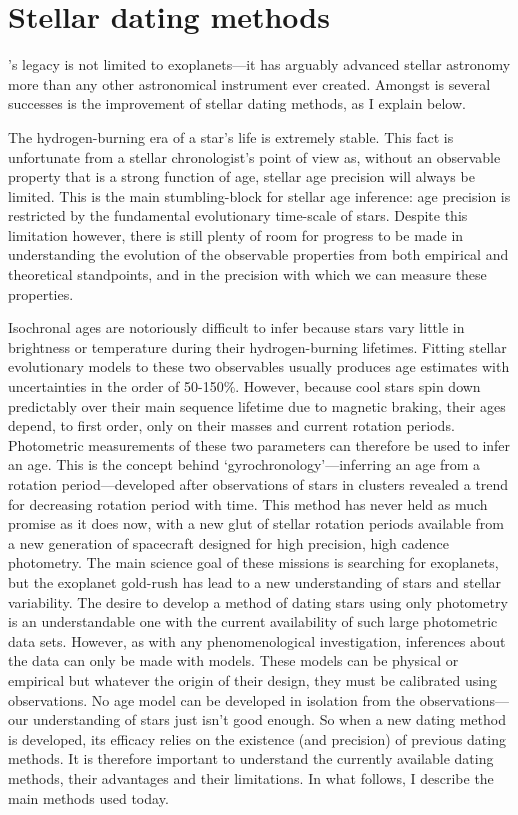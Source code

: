\section{Stellar dating methods}

\kepler's legacy is not limited to exoplanets---it has arguably advanced
stellar astronomy more than any other astronomical instrument ever created.
Amongst is several successes is the improvement of stellar dating methods, as
I explain below.

The hydrogen-burning era of a star's life is extremely stable.
This fact is unfortunate from a stellar chronologist's point of view as,
without an observable property that is a strong function of age, stellar age
precision will always be limited.
This is the main stumbling-block for stellar age inference: age precision is
restricted by the fundamental evolutionary time-scale of stars.
Despite this limitation however, there is still plenty of room for progress to
be made in understanding the evolution of the observable properties from both
empirical and theoretical standpoints, and in the precision with which we can
measure these properties.

Isochronal ages are notoriously difficult to infer because stars vary little
in brightness or temperature during their hydrogen-burning lifetimes.
Fitting stellar evolutionary models to these two observables usually produces
age estimates with uncertainties in the order of 50-150\%.
However, because cool stars spin down predictably over their main sequence
lifetime due to magnetic braking, their ages depend, to first order, only on
their masses and current rotation periods.
Photometric measurements of these two parameters can therefore be used to
infer an age.
This is the concept behind `gyrochronology'---inferring an age from a rotation
period---developed after observations of stars in clusters revealed a trend
for decreasing rotation period with time.
This method has never held as much promise as it does now, with a new glut of
stellar rotation periods available from a new generation of spacecraft
designed for high precision, high cadence photometry.
The main science goal of these missions is searching for exoplanets, but the
exoplanet gold-rush has lead to a new understanding of stars and stellar
variability.
The desire to develop a method of dating stars using only photometry is an
understandable one with the current availability of such large photometric
data sets.
However, as with any phenomenological investigation, inferences about the data
can only be made with models.
These models can be physical or empirical but whatever the origin of their
design, they must be calibrated using observations.
No age model can be developed in isolation from the observations---our
understanding of stars just isn't good enough.
So when a new dating method is developed, its efficacy relies on the existence
(and precision) of previous dating methods.
It is therefore important to understand the currently available dating
methods, their advantages and their limitations.
In what follows, I describe the main methods used today.

